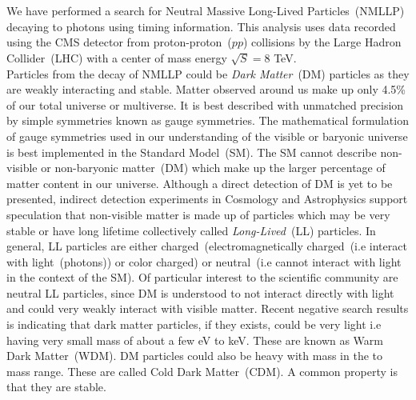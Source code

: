 \paragraph*{} \mbox{}\\
We have performed a search for Neutral Massive Long-Lived Particles~(NMLLP) decaying to photons using timing information. This analysis uses data recorded using the CMS detector from proton-proton~(\textbf{$pp$}) collisions by  the Large Hadron Collider~(LHC) with a center of mass energy  $\sqrt{S} = 8 $ TeV.
\mbox{}\\
Particles from the decay of NMLLP could be \textit{Dark Matter}~(DM) particles as they are weakly interacting and stable.
Matter observed around us make up only 4.5\% of our total universe or multiverse. It is best described with unmatched precision by simple symmetries known as gauge symmetries. The mathematical formulation of gauge symmetries used in our understanding of the visible or baryonic universe is best implemented in the Standard Model~(SM). The SM cannot describe non-visible or non-baryonic matter~(DM) which make up the larger percentage of matter content in our universe. Although a direct detection of DM is yet to be presented, indirect detection experiments in Cosmology and Astrophysics support speculation that non-visible matter is made up of particles which may be very stable or have long lifetime collectively called \textit{Long-Lived}~(LL) particles.  In general, LL particles are either charged~(electromagnetically charged~(i.e interact with light~(photons)) or color charged) or neutral~(i.e cannot interact with light in the context of the SM).
\newline
Of particular interest to the scientific community are neutral LL particles, since DM is understood to not interact directly with light and could very weakly interact with visible matter.  Recent negative search results is indicating that dark matter particles, if they exists, could be very light i.e having very small mass of about a few eV to keV. These are known as Warm Dark Matter~(WDM). DM particles could also be heavy with mass in the \GeV to \TeV mass range. These are called Cold Dark Matter~(CDM). A common  property is that they are stable.
